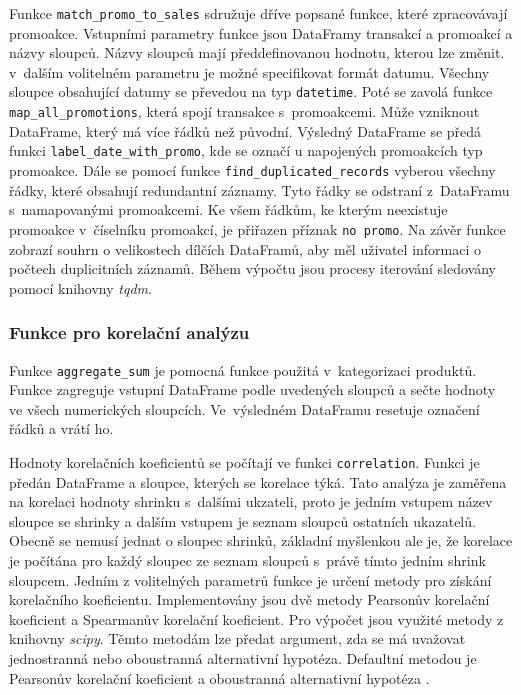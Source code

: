 Funkce \texttt{match\_promo\_to\_sales} sdružuje dříve popsané funkce, které zpracovávají promoakce. Vstupními parametry funkce jsou DataFramy transakcí a promoakcí a názvy sloupců. Názvy sloupců mají předdefinovanou hodnotu, kterou lze změnit. v~dalším volitelném parametru je možné specifikovat formát datumu. Všechny sloupce obsahující datumy se převedou na typ \texttt{datetime}. Poté se zavolá funkce \texttt{map\_all\_promotions}, která spojí transakce s~promoakcemi. Může vzniknout DataFrame, který má více řádků než původní. Výsledný DataFrame se předá funkci \texttt{label\_date\_with\_promo}, kde se označí u napojených promoakcích typ promoakce. Dále se pomocí funkce \texttt{find\_duplicated\_records} vyberou všechny řádky, které obsahují redundantní záznamy. Tyto řádky se odstraní z~DataFramu s~namapovanými promoakcemi. Ke všem řádkům, ke kterým neexistuje promoakce v~číselníku promoakcí, je přiřazen příznak \texttt{no promo}. Na závěr funkce zobrazí souhrn o velikostech dílčích DataFramů, aby měl uživatel informaci o počtech duplicitních záznamů. Během výpočtu jsou procesy iterování sledovány pomocí knihovny \emph{tqdm}.

\subsubsection*{Funkce pro korelační analýzu}

Funkce \texttt{aggregate\_sum} je pomocná funkce použitá v~kategorizaci produktů. Funkce zagreguje vstupní DataFrame podle uvedených sloupců a sečte hodnoty ve všech numerických sloupcích. Ve~výsledném DataFramu resetuje označení řádků a vrátí ho.

Hodnoty korelačních koeficientů se počítají ve funkci \texttt{correlation}. Funkci je předán DataFrame a sloupce, kterých se korelace týká. Tato analýza je zaměřena na korelaci hodnoty shrinku s~dalšími ukzateli, proto je jedním vstupem název sloupce se shrinky a dalším vstupem je seznam sloupců ostatních ukazatelů. Obecně se nemusí jednat o sloupec shrinků, základní myšlenkou ale je, že korelace je počítána pro každý sloupec ze seznam sloupců s~právě tímto jedním shrink sloupcem. Jedním z volitelných parametrů funkce je určení metody pro získání korelačního koeficientu. Implementovány jsou dvě metody Pearsonův korelační koeficient a Spearmanův korelační koeficient. Pro výpočet jsou využité metody z knihovny \emph{scipy}. Těmto metodám lze předat argument, zda se má uvažovat jednostranná nebo oboustranná alternativní hypotéza. Defaultní metodou je Pearsonův korelační koeficient a oboustranná alternativní hypotéza \cite{bib:scipyPearson}.

